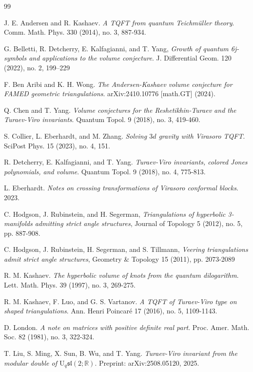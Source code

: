 \documentclass[11pt]{article}
\theoremstyle{remark}
\theoremstyle{remark}
\numberwithin{equation}{section}
\begin{document}
\begin{thebibliography}{99}

J. E. Andersen and R. Kashaev.
{\em A TQFT from quantum Teichm\"uller theory}.
Comm. Math. Phys. 330 (2014), no. 3, 887-934.


 G. Belletti, R. Detcherry, E. Kalfagianni, and T. Yang, {\em Growth of quantum 6j-symbols and
applications to the volume conjecture}. J. Differential Geom. 120 (2022), no. 2, 199–229


F. Ben Aribi and K. H. Wong.
\emph{The Andersen-Kashaev volume conjecture for FAMED geometric triangulations}.
arXiv:2410.10776 [math.GT] (2024).


Q. Chen and T. Yang.
{\em Volume conjectures for the Reshetikhin-Turaev and the
Turaev-Viro invariants}.
Quantum Topol. 9 (2018), no. 3, 419-460.


S. Collier, L. Eberhardt, and M. Zhang.
{\em Solving $3d$ gravity with Virasoro TQFT}.
SciPost Phys. 15 (2023), no. 4, 151.

R. Detcherry, E. Kalfagianni, and T. Yang.
{\em Turaev-Viro invariants, colored Jones polynomials, and volume}.
Quantum Topol. 9 (2018), no. 4, 775-813.

L. Eberhardt.
{\em Notes on crossing transformations of Virasoro conformal blocks}.
2023.

 C. Hodgson, J. Rubinstein, and H. Segerman, {\em Triangulations of hyperbolic 3-manifolds admitting strict angle structures}, Journal of Topology 5 (2012), no. 5, pp. 887-908.

 C. Hodgson, J. Rubinstein, H. Segerman, and S. Tillmann, {\em Veering triangulations admit strict angle structures}, Geometry \& Topology 15 (2011), pp. 2073-2089

R. M. Kashaev.
{\em The hyperbolic volume of knots from the quantum dilogarithm}.
Lett. Math. Phys. 39 (1997), no. 3, 269-275.

R. M. Kashaev, F. Luo, and G. S. Vartanov.
{\em A TQFT of Turaev-Viro type on shaped triangulations}.
Ann. Henri Poincar\'e 17 (2016), no. 5, 1109-1143.

D. London.
{\em A note on matrices with positive definite real part}.
Proc. Amer. Math. Soc. 82 (1981), no. 3, 322-324.

T. Liu, S. Ming, X. Sun, B. Wu, and T. Yang.
{\em Turaev-Viro invariant from the modular double of
$\mathrm U_q\mathfrak{sl}(2;\mathbb R)$}.
Preprint: arXiv:2508.05120, 2025.


\end{thebibliography}
\end{document}
